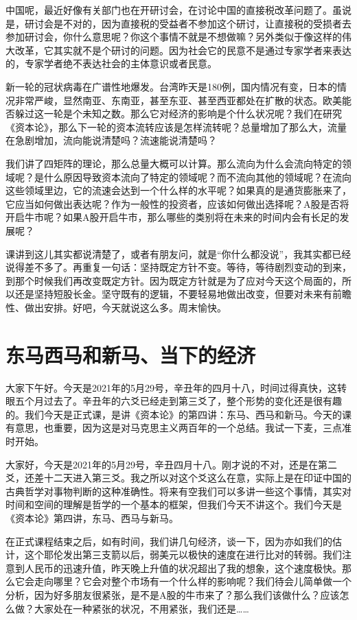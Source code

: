 \documentclass[UTF8, 12pt, a4paper]{ctexrep}
\begin{document}
中国呢，最近好像有关部门也在开研讨会，在讨论中国的直接税改革问题了。虽说是，研讨会是不对的，因为直接税的受益者不参加这个研讨，让直接税的受损者去参加研讨会，你什么意思呢？你这个事情不就是不想做嘛？另外类似于像这样的伟大改革，它其实就不是个研讨的问题。因为社会它的民意不是通过专家学者来表达的，专家学者绝不表达社会的主体意识或者民意。

新一轮的冠状病毒在广谱性地爆发。台湾昨天是180例，国内情况有变，日本的情况非常严峻，显然南亚、东南亚，甚至东亚、甚至西亚都处在扩散的状态。欧美能否躲过这一轮是个未知之数。那么它对经济的影响是个什么状况呢？我们在研究《资本论》，那么下一轮的资本流转应该是怎样流转呢？总量增加了那么大，流量在急剧增加，流向能说清楚吗？流速能说清楚吗？

我们讲了四矩阵的理论，那么总量大概可以计算。那么流向为什么会流向特定的领域呢？是什么原因导致资本流向了特定的领域呢？而不流向其他的领域呢？在流向这些领域里边，它的流速会达到一个什么样的水平呢？如果真的是通货膨胀来了，它应当如何做出表达呢？作为一般性的投资者，应该如何做出选择呢？A股是否将开启牛市呢？如果A股开启牛市，那么哪些的类别将在未来的时间内会有长足的发展呢？

课讲到这儿其实都说清楚了，或者有朋友问，就是“你什么都没说”，我其实都已经说得差不多了。再重复一句话：坚持既定方针不变。等待，等待剧烈变动的到来，到那个时候我们再改变既定方针。因为既定方针就是为了应对今天这个局面的，所以还是坚持短股长金。坚守既有的逻辑，不要轻易地做出改变，但要对未来有前瞻性、做出安排。好吧，今天就说这么多。周末愉快。

\section{东马西马和新马、当下的经济}

大家下午好。今天是2021年的5月29号，辛丑年的四月十八，时间过得真快，这转眼五个月过去了。辛丑年的六爻已经走到第三爻了，整个形势的变化还是很有趣的。我们今天是正式课，是讲《资本论》的第四讲：东马、西马和新马。今天的课有意思，也重要，因为这是对马克思主义两百年的一个总结。我试一下麦，三点准时开始。

大家好，今天是2021年的5月29号，辛丑四月十八。刚才说的不对，还是在第二爻，还差十二天进入第三爻。我之所以对这个爻这么在意，实际上是在印证中国的古典哲学对事物判断的这种准确性。将来有空我们可以多讲一些这个事情，其实对时间和空间的理解是哲学的一个基本的框架，但我们今天不讲这个。我们今天是《资本论》第四讲，东马、西马与新马。

在正式课程结束之后，如有时间，我们讲几句经济，谈一下，因为亦如我们的估计，这个耶伦发出第三支箭以后，弱美元以极快的速度在进行比对的转弱。我们注意到人民币的迅速升值，昨天晚上升值的状况超出了我的想象，这个速度极快。那么它会走向哪里？它会对整个市场有一个什么样的影响呢？我们待会儿简单做一个分析，因为好多朋友很紧张，是不是A股的牛市来了？那么我们该做什么？应该怎么做？大家处在一种紧张的状况，不用紧张，我们还是……
\end{document}
